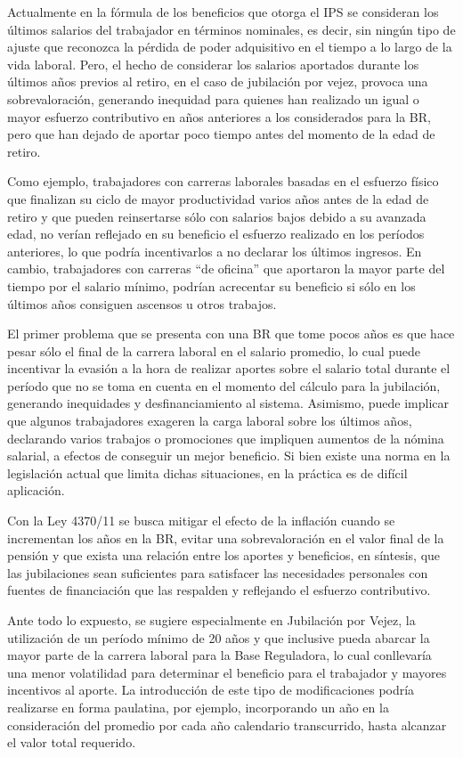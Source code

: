 \documentclass[a4paper,11pt]{article}
\begin{document}
Actualmente en la fórmula de los beneficios que otorga el IPS se consideran los últimos salarios del trabajador en términos nominales, es decir, sin ningún tipo de ajuste que reconozca la pérdida de poder adquisitivo en el tiempo a lo largo de la vida laboral. Pero, el hecho de considerar los salarios aportados durante los últimos años previos al retiro, en el caso de jubilación por vejez, provoca una sobrevaloración, generando inequidad para quienes han realizado un igual o mayor esfuerzo contributivo en años anteriores a los considerados para la BR, pero que han dejado de aportar poco tiempo antes del momento de la edad de retiro.

Como ejemplo, trabajadores con carreras laborales basadas en el esfuerzo físico que finalizan su ciclo de mayor productividad varios años antes de la edad de retiro y que pueden reinsertarse sólo con salarios bajos debido a su avanzada edad, no verían reflejado en su beneficio el esfuerzo realizado en los períodos anteriores, lo que podría incentivarlos a no declarar los últimos ingresos. En cambio, trabajadores con carreras “de oficina” que aportaron la mayor parte del tiempo por el salario mínimo, podrían acrecentar su beneficio si sólo en los últimos años consiguen ascensos u otros trabajos. 

El primer problema que se presenta con una BR que tome pocos años es que hace pesar sólo el final de la carrera laboral en el salario promedio, lo cual puede incentivar la evasión a la hora de realizar aportes sobre el salario total durante el período que no se toma en cuenta en el momento del cálculo para la jubilación, generando inequidades y desfinanciamiento al sistema. Asimismo, puede implicar que algunos trabajadores exageren la carga laboral sobre los últimos años, declarando varios trabajos o promociones que impliquen aumentos de la nómina salarial, a efectos de conseguir un mejor beneficio. Si bien existe una norma en la legislación actual que limita dichas situaciones, en la práctica es de difícil aplicación. 

Con la Ley 4370/11 se busca mitigar el efecto de la inflación cuando se incrementan los años en la BR, evitar una sobrevaloración en el valor final de la pensión y que exista una relación entre los aportes y beneficios, en síntesis, que las jubilaciones sean suficientes para satisfacer las necesidades personales con fuentes de financiación que las respalden y reflejando el esfuerzo contributivo.

Ante todo lo expuesto, se sugiere especialmente en Jubilación por Vejez, la utilización de un período mínimo de 20 años y que inclusive pueda abarcar la mayor parte de la carrera laboral para la Base Reguladora, lo cual conllevaría una menor volatilidad para determinar el beneficio para el trabajador y mayores incentivos al aporte. La introducción de este tipo de modificaciones podría realizarse en forma paulatina, por ejemplo, incorporando un año en la consideración del promedio por cada año calendario transcurrido, hasta alcanzar el valor total requerido. 
\end{document}
